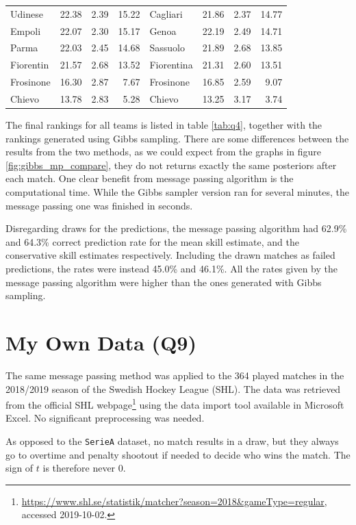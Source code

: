 \documentclass{article}
\begin{document}
\begin{table}[t]
\begin{tabular}{lrrr|lrrr}
				Udinese    &  22.38  &  2.39  &  15.22  &  Cagliari    &  21.86  &  2.37  & 14.77 \\
				Empoli     &  22.07  &  2.30  &  15.17  &  Genoa       &  22.19  &  2.49  & 14.71 \\
				Parma      &  22.03  &  2.45  &  14.68  &  Sassuolo    &  21.89  &  2.68  & 13.85 \\
				Fiorentin  &  21.57  &  2.68  &  13.52  &  Fiorentina  &  21.31  &  2.60  & 13.51 \\
				Frosinone  &  16.30  &  2.87  &   7.67  &  Frosinone   &  16.85  &  2.59  &  9.07 \\
				Chievo     &  13.78  &  2.83  &   5.28  &  Chievo      &  13.25  &  3.17  &  3.74 \\\bottomrule
			\end{tabular}
		\end{table}
	
	The final rankings for all teams is listed in table \ref{tab:q4}, together with the rankings generated using Gibbs sampling.
	There are some differences between the results from the two methods, as we could expect from the graphs in figure \ref{fig:gibbs_mp_compare}, they do not returns exactly the same posteriors after each match.
	One clear benefit from message passing algorithm is the computational time. While the Gibbs sampler version ran for several minutes, the message passing one was finished in seconds.
	
	Disregarding draws for the predictions, the message passing algorithm had 62.9\% and 64.3\% correct prediction rate for the mean skill estimate, and the conservative skill estimates respectively.
	Including the drawn matches as failed predictions, the rates were instead 45.0\% and 46.1\%.
	All the rates given by the message passing algorithm were higher than the ones generated with Gibbs sampling.
	
	\section{My Own Data (Q9)}
	The same message passing method was applied to the 364 played matches in the 2018/2019 season of the Swedish Hockey League (SHL). The data was retrieved from the official SHL webpage\footnote{\url{https://www.shl.se/statistik/matcher?season=2018&gameType=regular}, accessed 2019-10-02.} using the data import tool available in Microsoft Excel. No significant preprocessing was needed.
	
	As opposed to the \texttt{SerieA} dataset, no match results in a draw, but they always go to overtime and penalty shootout if needed to decide who wins the match. The sign of $t$ is therefore never 0.
	
\end{document}
